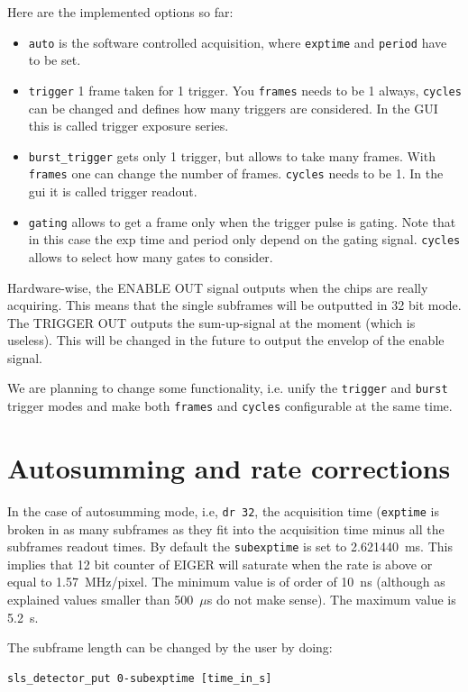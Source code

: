 \documentclass{article}
\newcommand{\E}{EIGER\xspace}
\begin{document}
Here are the implemented options so far:
\begin{itemize}
\item {\tt{auto}} is the software controlled acquisition, where {\tt{exptime}} and {\tt{period}} have to be set.
\item {\tt{trigger}} 1 frame taken for 1 trigger. You {\tt{frames}} needs to be  1 always, {\tt{cycles}} can be changed and defines how many triggers are considered. In the GUI this is called trigger exposure series. 
\item {\tt{burst\_trigger}} gets only 1 trigger, but allows to take many frames. With {\tt{frames}} one can change the number of frames. {\tt{cycles}} needs to be 1. In the gui it is called trigger readout.
\item{\tt{gating}} allows to get a frame only when the trigger pulse is gating. Note that in this case the exp time and period only depend on the gating signal. {\tt{cycles}} allows to select how many gates to consider. 
\end{itemize}

Hardware-wise, the ENABLE OUT signal outputs when the chips are really acquiring. This means that the single subframes will be outputted in 32 bit mode. The TRIGGER OUT outputs the sum-up-signal at the moment (which is useless). This will be changed in the future to output the envelop of the enable signal. 

We are planning to change some functionality, i.e. unify the {\tt{trigger}} and {\tt{burst}} trigger modes and make both {\tt{frames}} and {\tt{cycles}} configurable at the same time.

\section{Autosumming and rate corrections}

In the case of autosumming mode, i.e, {\tt{dr 32}}, the acquisition time ({\tt{exptime}} is broken in as many subframes as they fit into the acquisition time minus all the subframes readout times. By default the {\tt{subexptime}} is set to 2.621440~ms. This implies that 12 bit counter of \E will saturate when the rate is above or equal to 1.57~MHz/pixel. The minimum value is of order of 10~ns (although as explained values smaller than 500~$\mu$s do not make sense). The maximum value is 5.2~s.

The subframe length can be changed by the user by doing: 
\begin{verbatim}
sls_detector_put 0-subexptime [time_in_s] 
\end{verbatim}
\end{document}
